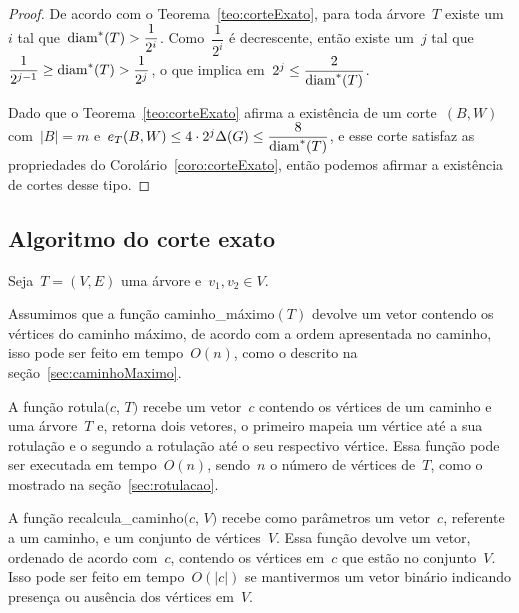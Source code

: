 	\begin{proof}
		De acordo com o Teorema~\ref{teo:corteExato}, para toda árvore~$T$
		existe um~$i$ tal que~$\mathrm{diam}^*(T)>\dfrac{1}{2^i}$. 
		Como~$\dfrac{1}{2^i}$ é decrescente, então existe um~$j$ tal
		que~$\dfrac{1}{2^{j-1}}\ge\mathrm{diam}^*(T)>\dfrac{1}{2^j}$,
		o que implica em~$2^j\le\dfrac{2}{\mathrm{diam}^*(T)}$.

		Dado que o Teorema~\ref{teo:corteExato} afirma a existência de um 
		corte~$(B,W)$ com~${|B|=m}$ 
		e~$e_T(B,W)\le 4\cdot 2^j\Delta(G)\le \dfrac{8}{\mathrm{diam}^*(T)}$,
		e esse corte satisfaz as propriedades do 
		Corolário~\ref{coro:corteExato}, então podemos afirmar a existência 
		de cortes desse tipo.
	\end{proof}

	\bigskip
	\bigskip
	\bigskip
	\bigskip
	\bigskip

	\subsection{Algoritmo do corte exato}

		Seja~${T=(V,E)}$ uma árvore e~${v_1,v_2\in V}$.

		Assumimos que a função {\sc caminho\_máximo}$(T)$ 
		devolve um vetor contendo os vértices do caminho 
		máximo, de acordo com a ordem apresentada no caminho, 
		isso pode ser feito em tempo~$O(n)$, como o descrito na 
		seção~\ref{sec:caminhoMaximo}.

		A função {\sc rotula}$(c$, $T)$ recebe um vetor~$c$
		contendo os vértices de um caminho e uma árvore~$T$
		e, retorna dois vetores, o primeiro mapeia um vértice até 
		a sua rotulação e o segundo a rotulação até o seu respectivo
		vértice. 
		Essa função pode ser executada em tempo~$O(n)$, sendo~$n$
		o número de vértices de~$T$, como o mostrado na 
		seção~\ref{sec:rotulacao}.

		A função {\sc recalcula\_caminho}$(c$, $V)$
		recebe como parâmetros um vetor~$c$, referente a um 
		caminho, e um conjunto de vértices~$V$. Essa função devolve
		um vetor, ordenado de acordo com~$c$, contendo os 
		vértices em~$c$ que estão no conjunto~$V$. 
		Isso pode ser feito em tempo~$O(|c|)$ se mantivermos um 
		vetor binário indicando presença ou ausência dos vértices 
		em~$V$.



